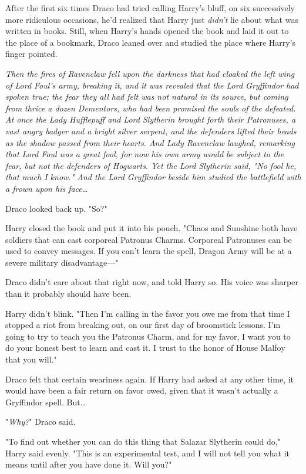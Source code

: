 After the first six times Draco had tried calling Harry's bluff, on six 
successively more ridiculous occasions, he'd realized that Harry just 
\emph{didn't} lie about what was written in books. Still, when Harry's hands 
opened the book and laid it out to the place of a bookmark, Draco leaned over 
and studied the place where Harry's finger pointed.

\emph{Then the fires of Ravenclaw fell upon the darkness that had cloaked the 
left wing of Lord Foul's army, breaking it, and it was revealed that the Lord 
Gryffindor had spoken true; the fear they all had felt was not natural in its 
source, but coming from thrice a dozen Dementors, who had been promised the 
souls of the defeated. At once the Lady Hufflepuff and Lord Slytherin brought 
forth their Patronuses, a vast angry badger and a bright silver serpent, and 
the defenders lifted their heads as the shadow passed from their hearts. And 
Lady Ravenclaw laughed, remarking that Lord Foul was a great fool, for now his 
own army would be subject to the fear, but not the defenders of Hogwarts. Yet 
the Lord Slytherin said, "No fool he, that much I know." And the Lord 
Gryffindor beside him studied the battlefield with a frown upon his 
face{\ldots}}

Draco looked back up. "So?"

Harry closed the book and put it into his pouch. "Chaos and Sunshine both have 
soldiers that can cast corporeal Patronus Charms. Corporeal Patronuses can be 
used to convey messages. If you can't learn the spell, Dragon Army will be at a 
severe military disadvantage---"

Draco didn't care about that right now, and told Harry so. His voice was 
sharper than it probably should have been.

Harry didn't blink. "Then I'm calling in the favor you owe me from that time I 
stopped a riot from breaking out, on our first day of broomstick lessons. I'm 
going to try to teach you the Patronus Charm, and for my favor, I want you to 
do your honest best to learn and cast it. I trust to the honor of House Malfoy 
that you will."

Draco felt that certain weariness again. If Harry had asked at any other time, 
it would have been a fair return on favor owed, given that it wasn't actually a 
Gryffindor spell. But{\ldots}

"\emph{Why?}" Draco said.

"To find out whether you can do this thing that Salazar Slytherin could do," 
Harry said evenly. "This is an experimental test, and I will not tell you what 
it means until after you have done it. Will you?"

